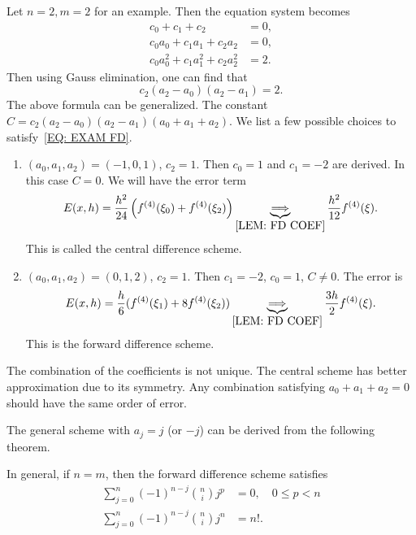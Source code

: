 \begin{example}
    Let $n = 2, m = 2$ for an example. Then the equation system becomes \begin{equation}\label{EQ: EXAM FD}
        \begin{aligned}
            c_0  + c_1  + c_2  &= 0, \\
            c_0 a_0 + c_1 a_1 + c_2 a_2 &= 0, \\
            c_0 a_0^2 + c_1 a_1^2 + c_2 a_2^2 &= 2.  
        \end{aligned}
    \end{equation}
    Then using Gauss elimination, one can find that 
    $$c_2 (a_2 - a_0) (a_2 - a_1) = 2.$$
    The above formula can be generalized. The constant $C = c_2(a_2 - a_0)(a_2 - a_1) (a_0 + a_1 + a_2)$. We list a few possible choices to satisfy~\eqref{EQ: EXAM FD}. 
    \begin{enumerate}
        \item $(a_0, a_1, a_2) = (-1, 0, 1)$, $c_2 = 1$. Then $c_0 = 1$ and $c_1 = -2$ are derived. In this case $C = 0$. We will have the error term 
        $$E(x, h) = \frac{h^2}{24}\left(f^{(4)}(\xi_0) + f^{(4)}(\xi_2)\right) \underbrace{\Longrightarrow }_{\ref{LEM: FD COEF}} \frac{h^2}{12} f^{(4)}(\xi).$$
        This is called the central difference scheme.
        \item $(a_0, a_1, a_2) = (0, 1, 2)$, $c_2 = 1$. Then $c_1 = -2$, $c_0 = 1$,  $C \neq 0$. The error is 
        $$E(x, h) = \frac{h}{6} (f^{(4)}(\xi_1) + 8 f^{(4)}(\xi_2)) \underbrace{\Longrightarrow }_{\ref{LEM: FD COEF}} \frac{3h}{2} f^{(4)}(\xi).$$
        This is the forward difference scheme.
    \end{enumerate}
    The combination of the coefficients is not unique. The central scheme has better approximation due to its symmetry. Any combination satisfying $a_0 + a_1 + a_2 = 0$ should have the same order of error.
\end{example}
The general scheme with $a_j = j$ (or $-j$) can be derived from the following theorem.
\begin{theorem}\label{THM: FWD DIFF}
    In general, if $n = m$, then the forward difference scheme satisfies 
    \begin{equation}
        \begin{aligned}
            \sum_{j=0}^n (-1)^{n-j} \binom{n}{i} j^p &= 0,\quad 0\le p < n \\
            \sum_{j=0}^n (-1)^{n-j} \binom{n}{i} j^n &= n!.   
        \end{aligned}
    \end{equation}
\end{theorem}
